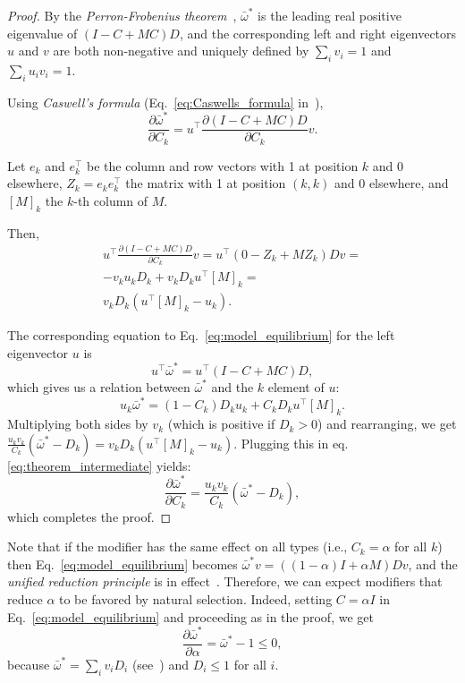 \documentclass[a4paper,twocolumn]{article}   	%
\newcommand*{\tr}{^\intercal}
\begin{document}
\begin{proof}
By the \emph{Perron-Frobenius theorem}~\cite[Appendix~A]{Otto2007},
$\bar{\omega}^*$ is the leading real positive eigenvalue of $(I-C+MC)D$,
and the corresponding left and right eigenvectors $u$ and $v$ are both non-negative and uniquely defined by $\sum_i{v_i} = 1$ and $\sum_i{u_i v_i} = 1$.

Using \emph{Caswell's formula} (Eq.~\ref{eq:Caswells_formula} in~),
$$
\frac{\partial \bar{\omega}^*}{\partial C_k} = 
u\tr \frac{\partial (I-C+MC)D}{\partial C_k} v.
$$

Let $e_k$ and $e\tr_k$ be the column and row vectors with 1 at position $k$ and 0 elsewhere, $Z_k = e_k e\tr_k$ the matrix with 1 at position $(k,k)$ and 0 elsewhere, and $[M]_k$ the $k$-th column of $M$.

Then,
\begin{equation}\label{eq:theorem_intermediate}
\begin{aligned}
u\tr \frac{\partial (I-C+MC)D}{\partial C_k} v = 
u\tr (0 - Z_k + M Z_k)D v = \\
-v_k u_k D_k + v_k D_k u\tr[M]_k = \\
v_k D_k (u\tr[M]_k - u_k). 
\end{aligned}
\end{equation}

The corresponding equation to Eq.~\ref{eq:model_equilibrium} for the left
eigenvector $u$ is 
$$
u\tr \bar{\omega}^* = u\tr (I - C + MC) D,
$$
which gives us a relation between $\bar{\omega}^*$ and the $k$
element of $u$:
$$
u_k \bar{\omega}^* = (1-C_k) D_k u_k + C_k D_k u\tr [M]_k.
$$
Multiplying both sides by $v_k$ (which is positive if $D_k>0$) and rearranging, we get $\frac{u_k v_k}{C_k} (\bar{\omega}^* - D_k) = v_k D_k(u\tr [M]_k - u_k)$.
Plugging this in eq. \ref{eq:theorem_intermediate} yields:
$$
\frac{\partial \bar{\omega}^*}{\partial C_k} = 
\frac{u_k v_k}{C_k} (\bar{\omega}^* - D_k),
$$
which completes the proof.
\end{proof}

Note that if the modifier has the same effect on all types (i.e.,
$C_k = \alpha$ for all $k$) then Eq.~\ref{eq:model_equilibrium}
becomes $\bar{\omega}^* v = ((1-\alpha)I + \alpha M)Dv$,
and the \emph{unified reduction principle} is in effect~\cite[eqs. 65, 72]{Altenberg2017}.
Therefore, we can expect modifiers that reduce $\alpha$ to be favored by natural selection.
Indeed, setting $C = \alpha I$ in Eq.~\ref{eq:model_equilibrium} and proceeding as in the proof, we get
$$
\frac{\partial \bar{\omega}^*}{\partial \alpha} = 
\bar{\omega}^* - 1 \le 0,
$$
because $\bar{\omega}^* = \sum_i{v_i D_i}$ (see~) and $D_i \le 1$ for all $i$.
\end{document}
